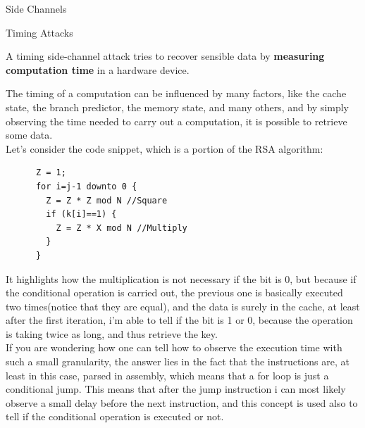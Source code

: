 \begin{section}{Side Channels}
  \begin{subsection}{Timing Attacks}
    \begin{boxH}
      A timing side-channel attack tries to recover sensible data by \textbf{measuring computation
      time} in a hardware device.
    \end{boxH}
    The timing of a computation can be influenced by many factors, like the cache state, the branch 
    predictor, the memory state, and many others, and by simply observing the time needed to carry
    out a computation, it is possible to retrieve some data.\\
    Let's consider the code snippet, which is a portion of the RSA algorithm:
    \begin{verbatim}
      Z = 1;
      for i=j-1 downto 0 {
        Z = Z * Z mod N //Square
        if (k[i]==1) {
          Z = Z * X mod N //Multiply
        }
      }
    \end{verbatim}
    It highlights how the multiplication is not necessary if the bit is 0, but because if the
    conditional operation is carried out, the previous one is basically executed two times(notice
    that they are equal), and the data is surely in the cache, at least after the first iteration,
    i'm able to tell if the bit is 1 or 0, because the operation is taking twice as long, and thus
    retrieve the key.\\
    If you are wondering how one can tell how to observe the execution time with such a small
    granularity, the answer lies in the fact that the instructions are, at least in this case,
    parsed in assembly, which means that a for loop is just a conditional jump. This means that
    after the jump instruction i can most likely observe a small delay before the next instruction,
    and this concept is used also to tell if the conditional operation is executed or not.\\
  \end{subsection}


\end{section}
